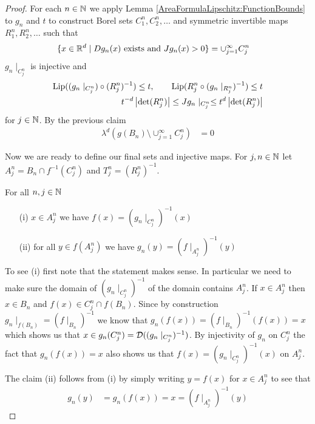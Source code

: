 \begin{proof}
For each $n \in \mathbb{N}$ we apply Lemma \ref{AreaFormulaLipschitz:FunctionBounds} to $g_n$ and $t$ to construct Borel sets
$C^n_1, C^n_2, \dotsc$ and symmetric invertible maps $R^n_1, R^n_2, \dotsc$ such that 
\begin{align*}
\lbrace x \in \mathbb{R}^d \mid Dg_n(x) \text{ exists and } Jg_n(x) > 0\rbrace &= \cup_{j=1}^\infty C^n_j
\end{align*}
$g_n \mid_{C^n_j}$ is injective and 
\begin{align*}
\operatorname*{Lip}((g_n \mid_{C^n_j}) \circ  (R^n_j)^{-1} ) \leq t, \qquad \operatorname*{Lip}(R^n_j \circ (g_n  \mid_{R^n_j})^{-1} ) \leq t \\
t^{-d} \left \vert \det(R^n_j) \right \vert \leq Jg_n\mid_{C^n_j} \leq t^{d} \left \vert \det(R^n_j) \right \vert
\end{align*}
for $j \in \mathbb{N}$.  By the previous claim 
\begin{align*}
\lambda^d\left(g(B_n) \setminus \cup_{j=1}^\infty C^n_j \right) &= 0
\end{align*}

Now we are ready to define our final sets and injective maps.  For $j,n \in \mathbb{N}$ let
$A^n_j = B_n \cap f^{-1}(C^n_j)$ and $T^n_j = (R^n_j)^{-1}$.

\begin{clm}\label{clm:CoareaFormulaLipschitz:FunctionBounds:SimpleFormulas} For all $n,j \in \mathbb{N}$ 
\begin{itemize}
\item[(i)] $x \in A^n_j$ we have $f(x) = (g_n \mid_{C^n_j})^{-1}(x)$ 
\item[(ii)] for all $y \in f(A^n_j)$ we have $g_n(y) = (f \mid_{A^n_j})^{-1}(y)$
\end{itemize}
\end{clm}
To see (i) first note that the statement makes sense.  In particular we need to make sure the domain of $(g_n \mid_{C^n_j})^{-1}$ of the domain contains $A^n_j$.
If $x \in A^n_j$ then
$x \in B_n$ and $f(x) \in C^n_j \cap f(B_n)$.  Since by construction $g_n \mid_{f(B_n)} = (f \mid_{B_n})^{-1}$ we know that
$g_n(f(x)) = (f \mid_{B_n})^{-1}(f(x)) = x$ which shows us that $x \in g_n(C^n_j) = \mathcal{D}((g_n \mid_{C^n_j})^{-1})$.  By injectivity of $g_n$ on $C^n_j$ the fact that $g_n(f(x)) =x$ also shows us that
$f(x) = (g_n \mid_{C^n_j})^{-1}(x)$ on $A^n_j$.

The claim (ii) follows from (i) by simply writing $y=f(x)$ for $x \in A^n_j$ to see that 
\begin{align*}
g_n(y) &= g_n(f(x)) = x = (f \mid_{A^n_j})^{-1}(y)
\end{align*}



\end{proof}
